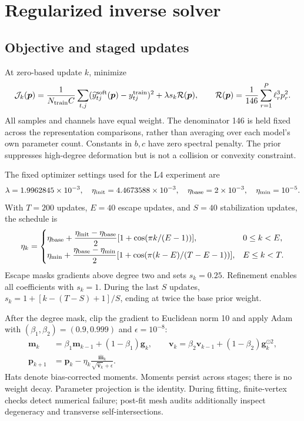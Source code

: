 \documentclass[10pt,a4paper]{article}
\newcommand{\vect}[1]{\bm{#1}}
\begin{document}
\clearpage
\section{Regularized inverse solver}
\subsection{Objective and staged updates}
At zero-based update $k$, minimize
\begin{equation}
 \mathcal J_k(\vect p)=\frac{1}{N_{\rm train}C}
 \sum_{t,j}(\widehat y^{\rm soft}_{tj}(\vect p)-y^{\rm train}_{tj})^2
 +\lambda s_k\mathcal R(\vect p),\qquad
 \mathcal R(\vect p)=\frac{1}{146}\sum_{r=1}^{P}\ell_r^3p_r^2.
 \label{eq:loss}
\end{equation}
All samples and channels have equal weight. The denominator 146 is held
fixed across the representation comparisons, rather than averaging
over each model's own parameter count. Constants in $b,c$ have zero
spectral penalty. The prior suppresses high-degree deformation but is
not a collision or convexity constraint.

The fixed optimizer settings used for the L4 experiment are
\begin{equation}
 \lambda=1.9962845\times10^{-3},\quad
 \eta_{\rm init}=4.4673588\times10^{-3},\quad
 \eta_{\rm base}=2\times10^{-3},\quad\eta_{\min}=10^{-5}.
\end{equation}
With $T=200$ updates, $E=40$ escape updates, and $S=40$ stabilization
updates, the schedule is
\begin{equation}
 \eta_k=\begin{cases}
 \eta_{\rm base}+\dfrac{\eta_{\rm init}-\eta_{\rm base}}{2}
 [1+\cos(\pi k/(E-1))],&0\leq k<E,\\[4pt]
 \eta_{\min}+\dfrac{\eta_{\rm base}-\eta_{\min}}{2}
 [1+\cos(\pi(k-E)/(T-E-1))],&E\leq k<T.
 \end{cases}
\end{equation}
Escape masks gradients above degree two and sets $s_k=0.25$.
Refinement enables all coefficients with $s_k=1$.
During the last $S$ updates,
$s_k=1+[k-(T-S)+1]/S$, ending at twice the base prior weight.

After the degree mask, clip the gradient to Euclidean norm 10 and apply
Adam~\cite{adamoptimizer} with $(\beta_1,\beta_2)=(0.9,0.999)$ and
$\epsilon=10^{-8}$:
\begin{align}
 \vect m_k&=\beta_1\vect m_{k-1}+(1-\beta_1)\vect g_k,\qquad
 \vect v_k=\beta_2\vect v_{k-1}+(1-\beta_2)\vect g_k^{\odot2},\\
 \vect p_{k+1}&=\vect p_k-\eta_k
 \frac{\widehat{\vect m}_k}{\sqrt{\widehat{\vect v}_k}+\epsilon}.
\end{align}
Hats denote bias-corrected moments. Moments persist across stages; there
is no weight decay. Parameter projection is the identity. During fitting, finite-vertex checks detect
numerical failure; post-fit mesh audits additionally inspect degeneracy
and transverse self-intersections.
\end{document}
